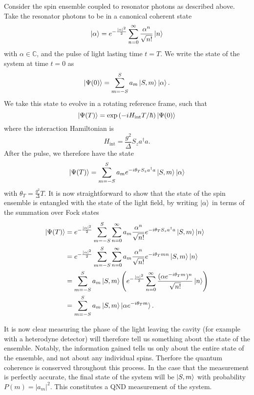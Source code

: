 \documentclass{article}
\begin{document}
Consider the spin ensemble coupled to resonator photons as described above. Take
the resonator photons to be in a canonical coherent state
%
\begin{equation}
  \ket{\alpha} = e^{-\frac{|\alpha|^2}{2}}\sum_{n=0}^\infty \frac{\alpha^n}{\sqrt{n!}} \ket{n}
\end{equation}
%
with $\alpha\in\mathbb{C}$, and the pulse of light lasting time $t=T$. We write
the state of the system at time $t=0$ as
%
\begin{equation}
  \ket{\Psi(0)} = \sum_{m=-S}^S a_m \ket{S, m}\ket{\alpha}.
\end{equation}
%
We take this state to evolve in a rotating reference frame, such that
%
\begin{equation}
  \ket{\Psi(T)} = \exp\left(-iH_\text{int}T/\hbar\right)\ket{\Psi(0)}
\end{equation}
%
where the interaction Hamiltonian is
%
\begin{equation}
  H_\text{int} = \frac{g^2}{\Delta} S_z a^\dagger a.
\end{equation}
%
After the pulse, we therefore have the state
%
\begin{equation}
  \ket{\Psi(T)} = \sum_{m=-S}^S a_m e^{-i\theta_T S_z
  a^\dagger a} \ket{S, m}\ket{\alpha}
\end{equation}
%
with $\theta_T = \frac{g^2}{\Delta} T$. It is now straightforward to show that
the state of the spin ensemble is entangled with the state of the light field,
by writing $\ket{\alpha}$ in terms of the summation over Fock states
%
\begin{align}
  \ket{\Psi(T)} &= e^{-\frac{|\alpha|^2}{2}}\sum_{m=-S}^S \sum_{n=0}^\infty a_m
   \frac{\alpha^n}{\sqrt{n!}} e^{-i\theta_T S_z a^\dagger a} \ket{S, m} \ket{n}
   \\
  &= e^{-\frac{|\alpha|^2}{2}}\sum_{m=-S}^S \sum_{n=0}^\infty a_m
  \frac{\alpha^n}{\sqrt{n!}} e^{-i\theta_T m n} \ket{S, m} \ket{n} \\
  &= \sum_{m=-S}^S a_m \ket{S, m} \left( e^{-\frac{|\alpha|^2}{2}}
  \sum_{n=0}^\infty \frac{(\alpha e^{-i\theta_T m})^n}{\sqrt{n!}}\ket{n}\right)
  \\
  &= \sum_{m=-S}^S a_m \ket{S, m}\ket{\alpha e^{-i\theta_T m}}.
\end{align}

It is now clear measuring the phase of the light leaving the cavity
(for example with a heterodyne detector) will therefore tell us something about
the state of the ensemble. Notably, the information gained tells us only about
the entire state of the ensemble, and not about any individual spins. Therfore
the quantum coherence is conserved throughout this process.
In the case that the measurement is perfectly accurate, the final state of the
system will be $\ket{S, m}$ with probability $P(m) = |a_m|^2$. This constitutes
a QND measurement of the system. %
\end{document}
